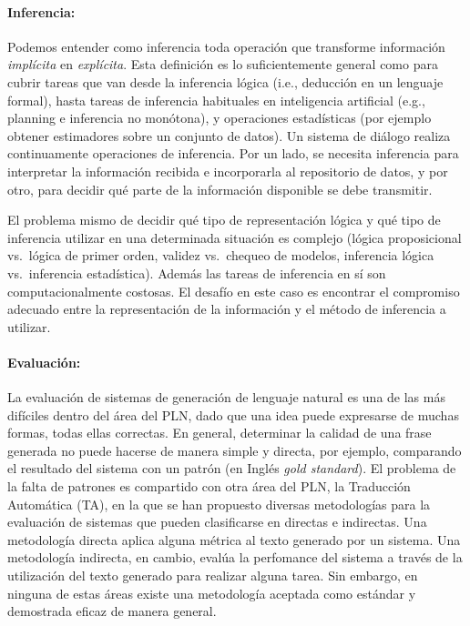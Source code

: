 
\paragraph{Inferencia:} Podemos entender como
inferencia toda operaci\'on que transforme informaci\'on \emph{impl\'icita} en
\emph{expl\'icita}.  Esta definici\'on es lo suficientemente general 
como para cubrir tareas que van desde la inferencia l\'ogica (i.e., deducci\'on 
en un lenguaje formal), hasta tareas de inferencia habituales en inteligencia
artificial (e.g., planning e inferencia no mon\'otona), y operaciones estad\'isticas (por
ejemplo obtener estimadores sobre un conjunto de datos).  Un sistema de
di\'alogo realiza continuamente operaciones de inferencia. Por un lado, 
se necesita inferencia para
interpretar la informaci\'on recibida e incorporarla al repositorio de datos,
y por otro, para decidir qu\'e parte de la informaci\'on disponible se debe
transmitir.

  El problema mismo de decidir qu\'e tipo de representaci\'on l\'ogica y qu\'e
tipo de inferencia utilizar  en una determinada situaci\'on  es complejo
(l\'ogica proposicional vs.\ l\'ogica de primer
orden, validez vs.\ chequeo de modelos, inferencia l\'ogica vs.\ inferencia
estad\'istica). Adem\'as las
tareas de inferencia en s\'i son computacionalmente costosas.  El desaf\'io en
este caso es encontrar el compromiso adecuado entre la representaci\'on de la
informaci\'on y el m\'etodo de inferencia a utilizar.

\paragraph{Evaluaci\'on:} La evaluaci\'on de sistemas de generaci\'on de
lenguaje natural es una de las m\'as dif\'iciles dentro del \'area del PLN, dado
que una idea puede expresarse de muchas formas, todas ellas correctas. En
general, determinar la calidad de una frase generada no puede hacerse de manera
simple y directa, por ejemplo, comparando el resultado del sistema con un
patr\'on (en Ingl\'es \emph{gold standard}). El problema de la falta de patrones es
compartido con otra \'area del PLN, la Traducci\'on Autom\'atica (TA), en la
que se han propuesto diversas metodolog\'ias para la evaluaci\'on de sistemas 
que pueden clasificarse en directas e indirectas. 
Una metodolog\'ia directa aplica alguna m\'etrica al texto generado por un
sistema. Una metodolog\'ia indirecta, en cambio, eval\'ua la perfomance del 
sistema a trav\'es de la utilizaci\'on del texto generado para realizar alguna tarea. Sin
embargo, en ninguna de estas \'areas existe una metodolog\'ia aceptada como
est\'andar y demostrada eficaz de manera general.

